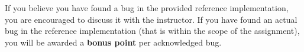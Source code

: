 If you believe you have found a bug in the provided reference
implementation, you are encouraged to discuss it with the
instructor. If you have found an actual bug in the reference
implementation (that is within the scope of the assignment), you will
be awarded a {\bf bonus point} per acknowledged bug.
